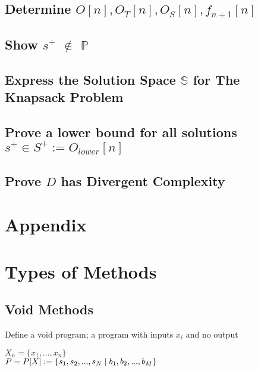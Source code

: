 \documentclass[11pt]{article}
\begin{document}
\subsection{Determine $O[n],O_T[n],O_S[n],f_{n+1}[n]$}
\subsection{Show $s^+$ $\notin$ $\mathbb{P}$}
\subsection{Express the Solution Space $\mathbb{S}$ for The Knapsack Problem}
\subsection{Prove a lower bound for all solutions $s^+ \in S^+ := O_{lower}[n]$}
\subsection{Prove $D$ has Divergent Complexity}




\newpage
\section*{Appendix}



\section*{Types of Methods} 


\subsection{Void Methods}
Define a void program; a program with inputs $x_i$ and no output
\begin{center}
$
X_n = \{x_1,...,x_n\}
$
\\ \vspace{2mm}
$P = P\lbrack X \rbrack := \{ s_1,s_2,...,s_{N}\hspace{1mm}|\hspace{1mm} b_1, b_2,...,b_M\}$
\end{center}
\end{document}
